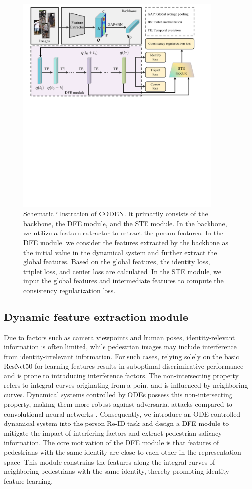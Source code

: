 \documentclass[12pt]{spieman}  %
\begin{document}
\begin{spacing}{2}
\begin{figure}[!htbp]
	\centering
	\includegraphics[width=4.0in]{Figure_1}
	\caption{Schematic illustration of CODEN. It primarily consists of the backbone, the DFE module, and the STE module. In the backbone, we utilize a feature extractor to extract the person features. In the DFE module, we consider the features extracted by the backbone as the initial value in the dynamical system and further extract the global features. Based on the global features, the identity loss, triplet loss, and center loss are calculated. In the STE module, we input the global features and intermediate features to compute the consistency regularization loss.}
	\label{fig:CODEN_framework}
\end{figure}

\subsection{Dynamic feature extraction module}
Due to factors such as camera viewpoints and human poses, identity-relevant information is often limited, while pedestrian images may include interference from identity-irrelevant information. For such cases, relying solely on the basic ResNet50 \cite{he2016deep} for learning features results in suboptimal discriminative performance and is prone to introducing interference factors. The non-intersecting property refers to integral curves originating from a point and is influenced by neighboring curves. Dynamical systems controlled by ODEs possess this non-intersecting property, making them more robust against adversarial attacks compared to convolutional neural networks \cite{chen2018neural, yan2019robustness}. Consequently, we introduce an ODE-controlled dynamical system into the person Re-ID task and design a DFE module to mitigate the impact of interfering factors and extract pedestrian saliency information. The core motivation of the DFE module is that features of pedestrians with the same identity are close to each other in the representation space. This module constrains the features along the integral curves of neighboring pedestrians with the same identity, thereby promoting identity feature learning.


\end{spacing}
\end{document}

